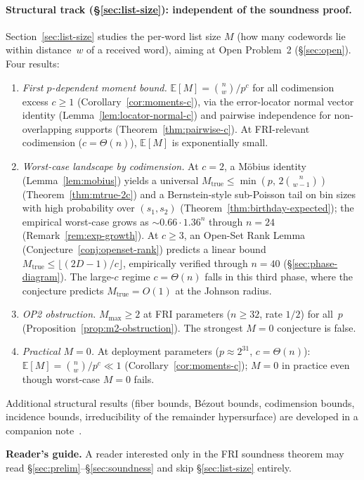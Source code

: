 \documentclass[11pt]{article}
\newcommand{\EE}{\mathbb{E}}
\begin{document}
\paragraph{Structural track (\S\ref{sec:list-size}): independent of the soundness proof.}
Section~\ref{sec:list-size} studies the per-word list size $M$ (how many codewords lie within distance~$w$ of a received word), aiming at Open Problem~2 (\S\ref{sec:open}). Four results:
\begin{enumerate}[nosep]
\item \emph{First $p$-dependent moment bound.} $\EE[M] = \binom{n}{w}/p^c$ for all codimension excess $c \geq 1$ (Corollary~\ref{cor:moments-c}), via the error-locator normal vector identity (Lemma~\ref{lem:locator-normal-c}) and pairwise independence for non-overlapping supports (Theorem~\ref{thm:pairwise-c}). At FRI-relevant codimension ($c = \Theta(n)$), $\EE[M]$ is exponentially small.
\item \emph{Worst-case landscape by codimension.} At $c = 2$, a M\"obius identity (Lemma~\ref{lem:mobius}) yields a universal $M_{\mathrm{true}} \leq \min(p,\, 2\binom{n}{w-1})$ (Theorem~\ref{thm:mtrue-2c}) and a Bernstein-style sub-Poisson tail on bin sizes with high probability over $(s_1, s_2)$ (Theorem~\ref{thm:birthday-expected}); the empirical worst-case grows as ${\sim} 0.66 \cdot 1.36^n$ through $n = 24$ (Remark~\ref{rem:exp-growth}). At $c \geq 3$, an Open-Set Rank Lemma (Conjecture~\ref{conj:openset-rank}) predicts a linear bound $M_{\mathrm{true}} \leq \lfloor(2D{-}1)/c\rfloor$, empirically verified through $n = 40$ (\S\ref{sec:phase-diagram}). The large-$c$ regime $c = \Theta(n)$ falls in this third phase, where the conjecture predicts $M_{\mathrm{true}} = O(1)$ at the Johnson radius.
\item \emph{OP2 obstruction.} $M_{\max} \geq 2$ at FRI parameters ($n \geq 32$, rate $1/2$) for all~$p$ (Proposition~\ref{prop:m2-obstruction}). The strongest $M = 0$ conjecture is false.
\item \emph{Practical $M = 0$.} At deployment parameters ($p \approx 2^{31}$, $c = \Theta(n)$): $\EE[M] = \binom{n}{w}/p^c \ll 1$ (Corollary~\ref{cor:moments-c}); $M = 0$ in practice even though worst-case $M = 0$ fails.
\end{enumerate}
Additional structural results (fiber bounds, B\'ezout bounds, codimension bounds, incidence bounds, irreducibility of the remainder hypersurface) are developed in a companion note~\cite{Note0088}.

\noindent\textbf{Reader's guide.} A reader interested only in the FRI soundness theorem may read \S\ref{sec:prelim}--\S\ref{sec:soundness} and skip \S\ref{sec:list-size} entirely.
\end{document}
